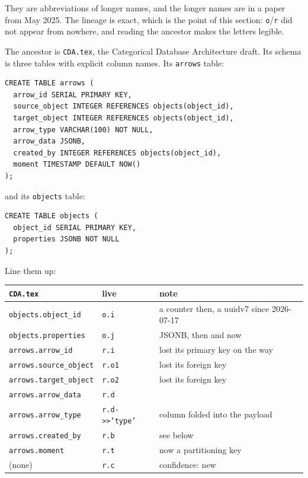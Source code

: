 They are abbreviations of longer names, and the longer names are in a paper from May 2025. The lineage is exact, which is the point of this section: \texttt{o}/\texttt{r} did not appear from nowhere, and reading the ancestor makes the letters legible.

The ancestor is \texttt{CDA.tex}, the Categorical Database Architecture draft. Its schema is three tables with explicit column names. Its \texttt{arrows} table:

\begin{lstlisting}
CREATE TABLE arrows (
  arrow_id SERIAL PRIMARY KEY,
  source_object INTEGER REFERENCES objects(object_id),
  target_object INTEGER REFERENCES objects(object_id),
  arrow_type VARCHAR(100) NOT NULL,
  arrow_data JSONB,
  created_by INTEGER REFERENCES objects(object_id),
  moment TIMESTAMP DEFAULT NOW()
);
\end{lstlisting}

and its \texttt{objects} table:

\begin{lstlisting}
CREATE TABLE objects (
  object_id SERIAL PRIMARY KEY,
  properties JSONB NOT NULL
);
\end{lstlisting}

Line them up:

\begin{center}
\begin{tabular}{llp{5.4cm}}
\toprule
\texttt{CDA.tex} & live & note \\
\midrule
\texttt{objects.object\_id} & \texttt{o.i} & a counter then, a uuidv7 since 2026-07-17 \\
\texttt{objects.properties} & \texttt{o.j} & JSONB, then and now \\
\midrule
\texttt{arrows.arrow\_id} & \texttt{r.i} & lost its primary key on the way \\
\texttt{arrows.source\_object} & \texttt{r.o1} & lost its foreign key \\
\texttt{arrows.target\_object} & \texttt{r.o2} & lost its foreign key \\
\texttt{arrows.arrow\_data} & \texttt{r.d} & \\
\texttt{arrows.arrow\_type} & \texttt{r.d->>'type'} & column folded into the payload \\
\texttt{arrows.created\_by} & \texttt{r.b} & see below \\
\texttt{arrows.moment} & \texttt{r.t} & now a partitioning key \\
\midrule
(none) & \texttt{r.c} & confidence: new \\
\bottomrule
\end{tabular}
\end{center}

